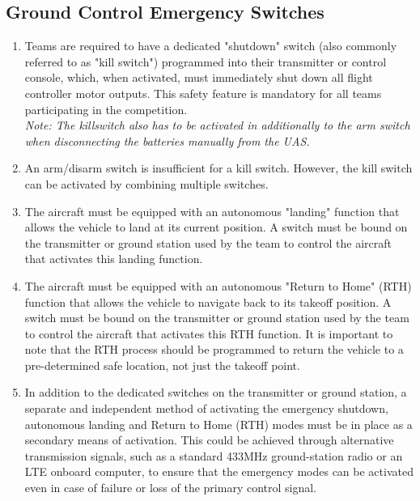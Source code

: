 \documentclass{article}
\begin{document}
\subsection{Ground Control Emergency Switches}
\begin{enumerate}
  \item Teams are required to have a dedicated "shutdown" switch (also commonly referred to as "kill switch") programmed into their transmitter or control console, which, when activated, must immediately shut down all flight controller motor outputs. This safety feature is mandatory for all teams participating in the competition. \\ \emph{Note: The killswitch also has to be activated in additionally to the arm switch when disconnecting the batteries manually from the UAS.}
  \item An arm/disarm switch is insufficient for a kill switch. However, the kill switch can be activated by combining multiple switches.
  \item The aircraft must be equipped with an autonomous "landing" function that allows the vehicle to land at its current position. A switch must be bound on the transmitter or ground station used by the team to control the aircraft that activates this landing function.  
  \item The aircraft must be equipped with an autonomous "Return to Home" (RTH) function that allows the vehicle to navigate back to its takeoff position. A switch must be bound on the transmitter or ground station used by the team to control the aircraft that activates this RTH function. It is important to note that the RTH process should be programmed to return the vehicle to a pre-determined safe location, not just the takeoff point.
  \item In addition to the dedicated switches on the transmitter or ground station, a separate and independent method of activating the emergency shutdown, autonomous landing and Return to Home (RTH) modes must be in place as a secondary means of activation. This could be achieved through alternative transmission signals, such as a standard 433MHz ground-station radio or an LTE onboard computer,  to ensure that the emergency modes can be activated even in case of failure or loss of the primary control signal.
\end{enumerate}
\end{document}
